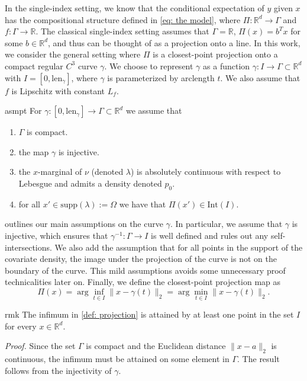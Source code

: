 \documentclass[11pt]{article}
\begin{document}
In the single-index setting, we know that the conditional expectation of $y$ given $x$ has the  compositional structure defined in \cref{eq: the model}, where $\Pi:\mathbb{R}^d \rightarrow \Gamma$ and $f: \Gamma\rightarrow\mathbb{R}$. The classical single-index setting assumes that $\Gamma = \mathbb{R}$, $\Pi(x) = b^{T}x$ for some $b \in \mathbb{R}^d$, and thus can be thought of as a projection onto a line. In this work, we consider the general setting where $\Pi$ is a closest-point projection onto a compact regular $C^3$ curve $\gamma$. We choose to represent $\gamma$ as a function $\gamma:I \rightarrow \Gamma \subset \mathbb{R}^d$ with $I = [0,\text{len}_{\gamma}]$, where $\gamma$ is parameterized by arclength $t$. We also assume that $f$ is Lipschitz with constant $L_f$.  
\begin{restatable}{asmpt}{} \label{assumption: the curve gamma}
    For $\gamma: [0, \text{len}_{\gamma}]\rightarrow \Gamma \subset \mathbb{R}^d$ we assume that
    \begin{enumerate}
        \item $\Gamma$ is compact.
        \item the map $\gamma$ is injective.
        \item the $x$-marginal of $\nu$ (denoted $\lambda$) is absolutely continuous with respect to Lebesgue and admits a density denoted $p_0$. 
        \item for all $x' \in \text{supp}(\lambda) := \Omega$ we have that $\Pi(x') \in \text{Int}(I)$.
    \end{enumerate}
\end{restatable}

 outlines our main assumptions on the curve $\gamma$. In particular, we assume that $\gamma$ is injective, which ensures that $\gamma^{-1}:\Gamma\rightarrow I$ is well defined and rules out any self-intersections. We also add the assumption that for all points in the support of the covariate density, the image under the projection of the curve is not on the boundary of the curve. This mild assumptions avoids some unnecessary proof technicalities later on. Finally, we define the closest-point projection map as
\begin{equation}\label{def: projection}
\Pi(x) = \arg\inf_{t\in I}\|x - \gamma(t)\|_2 = \arg\min_{t\in I}\|x - \gamma(t)\|_2.
\end{equation}
\begin{restatable}{rmk}{} \label{remark: infimum}
    The infimum in \cref{def: projection} is attained by at least one point in the set $I$ for every $x \in \mathbb{R}^d$.
\end{restatable}
\noindent \textit{Proof.} Since the set $\Gamma$ is compact and the Euclidean distance $\|x-a\|_2$ is continuous, the infimum must be attained on some element in $\Gamma$. The result follows from the injectivity of $\gamma$. 
\end{document}
